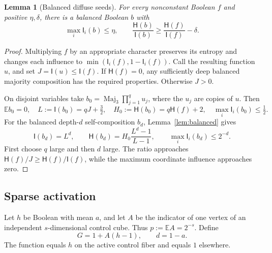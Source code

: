 \documentclass[11pt]{amsart}
\newtheorem{lemma}[theorem]{Lemma}
\theoremstyle{definition}
\theoremstyle{remark}
\newcommand{\E}{\mathbb E}
\newcommand{\HH}{\mathsf H}
\newcommand{\I}{\mathsf I}
\newcommand{\Maj}{\operatorname{Maj}}
\begin{document}
\begin{lemma}[Balanced diffuse seeds]\label{lem:diffuse}
For every nonconstant Boolean $f$ and positive $\eta,\delta$, there is a balanced Boolean $b$ with
\[
 \max_i\I_i(b)\le\eta,
 \qquad \frac{\HH(b)}{\I(b)}\ge\frac{\HH(f)}{\I(f)}-\delta.
\]
\end{lemma}
\begin{proof}
Multiplying $f$ by an appropriate character preserves its entropy and changes each influence to $\min(\I_i(f),1-\I_i(f))$. Call the resulting function $u$, and set $J=\I(u)\le\I(f)$. If $\HH(f)=0$, any sufficiently deep balanced majority composition has the required properties. Otherwise $J>0$.

On disjoint variables take $b_0=\Maj_3\prod_{j=1}^q u_j$, where the $u_j$ are copies of $u$. Then
\[
 \E b_0=0,\quad L:=\I(b_0)=qJ+\tfrac32,
 \quad H_0:=\HH(b_0)=q\HH(f)+2,
 \quad\max_i\I_i(b_0)\le\tfrac12.
\]
For the balanced depth-$d$ self-composition $b_d$, Lemma~\ref{lem:balanced} gives
\[
 \I(b_d)=L^d,\qquad
 \HH(b_d)=H_0\frac{L^d-1}{L-1},\qquad
 \max_i\I_i(b_d)\le2^{-d}.
\]
First choose $q$ large and then $d$ large. The ratio approaches $\HH(f)/J\ge\HH(f)/\I(f)$, while the maximum coordinate influence approaches zero.
\end{proof}

\subsection{Sparse activation}

Let $h$ be Boolean with mean $a$, and let $A$ be the indicator of one vertex of an independent $s$-dimensional control cube. Thus $p:=\E A=2^{-s}$. Define
\begin{equation}\label{eq:activate}
 G=1+A(h-1),\qquad d=1-a.
\end{equation}
The function equals $h$ on the active control fiber and equals $1$ elsewhere.
\end{document}

